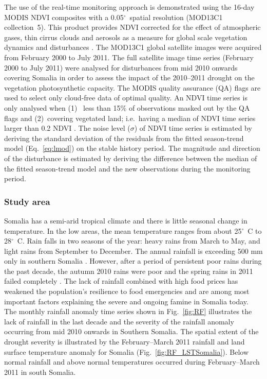 \documentclass[authoryear,preprint,review,10pt]{elsarticle}
\newcommand{\degree}{\ensuremath{^\circ}}
\begin{document}
The use of the real-time monitoring approach is demonstrated using the 16-day MODIS NDVI composites with a 0.05\degree \ spatial resolution (MOD13C1 collection~5). This product provides  NDVI corrected for the effect of atmospheric gases, thin cirrus clouds and aerosols as a measure for global scale vegetation dynamics and disturbances \citep{Huete2002}. The MOD13C1 global satellite images were acquired from February 2000 to July 2011. The full satellite image time series  (February 2000 to July 2011) were analysed for disturbances from mid 2010 onwards covering Somalia in order to assess the impact of the 2010--2011 drought on the vegetation photosynthetic capacity. The MODIS quality assurance (QA) flags are used to select only cloud-free data of optimal quality. An NDVI time series is only analysed when (1)~ less than 15\% of observations masked out by the QA flags and (2)~covering vegetated land; i.e.\ having a median of NDVI time series larger than 0.2 NDVI \citep{Beurs2009, deJong:wo, Vrieling:2011da}. The noise level ($\sigma$) of NDVI time series is estimated by deriving the standard deviation of the residuals from the fitted season-trend model (Eq.~\ref{eq:lmod}) on the stable history period.  The magnitude and direction of the disturbance is estimated by deriving the difference between the median of the fitted season-trend model and the new observations during the monitoring period.

\subsubsection*{Study area}

Somalia has a semi-arid tropical climate and there is little seasonal change in temperature. In the low areas, the mean temperature ranges from about 25\degree~C to 28\degree~C.  Rain falls in two seasons of the year: heavy rains from March to May, and light rains from September to December. The annual rainfall is exceeding 500 mm only in southern Somalia \citep{Muchiri2007}. However, after a period of persistent poor rains during the past decade, the autumn 2010 rains were poor and the spring rains in 2011 failed completely \citep{Funk:2011fg}. The lack of rainfall combined with high food prices has weakened the population's resilience to food emergencies and are among most important factors explaining the severe and ongoing famine in Somalia today. The monthly rainfall anomaly time series shown in Fig.~\ref{fig:RF} illustrates the lack of rainfall in the last decade and the severity of the rainfall anomaly occurring from mid 2010 onwards in Southern Somalia. The spatial extent of the drought severity is illustrated by the February--March 2011 rainfall \citep{Xie:1997tw} and land surface temperature anomaly for Somalia (Fig.~\ref{fig:RF_LSTSomalia}). Below normal rainfall and above normal temperatures occurred during February--March 2011 in south Somalia.
\end{document}
